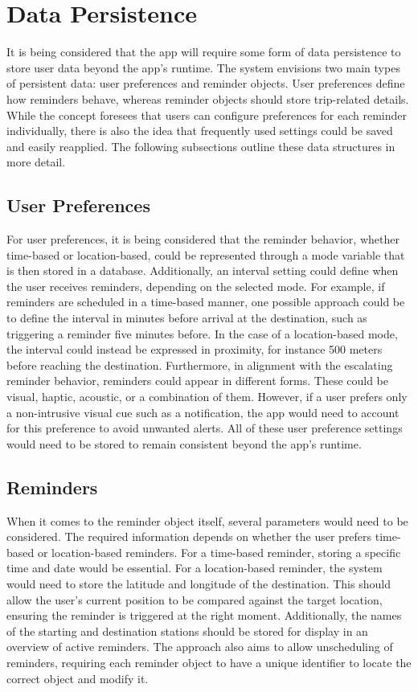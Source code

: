 \section{Data Persistence}
It is being considered that the app will require some form of data persistence to store user data beyond the app's runtime. 
The system envisions two main types of persistent data: user preferences and reminder objects. 
User preferences define how reminders behave, whereas reminder objects should store trip-related details.
While the concept foresees that users can configure preferences for each reminder individually, there is also the idea that frequently used settings could be saved and easily reapplied.
The following subsections outline these data structures in more detail.

\subsection{User Preferences}
For user preferences, it is being considered that the reminder behavior, whether time-based or location-based, could be represented through a mode variable that is then stored in a database.
Additionally, an interval setting could define when the user receives reminders, depending on the selected mode. 
For example, if reminders are scheduled in a time-based manner, one possible approach could be to define the interval in minutes before arrival at the destination, such as triggering a reminder five minutes before.
In the case of a location-based mode, the interval could instead be expressed in proximity, for instance 500 meters before reaching the destination.
Furthermore, in alignment with the escalating reminder behavior, reminders could appear in different forms. 
These could be visual, haptic, acoustic, or a combination of them. 
However, if a user prefers only a non-intrusive visual cue such as a notification, the app would need to account for this preference to avoid unwanted alerts.
All of these user preference settings would need to be stored to remain consistent beyond the app's runtime.

\subsection{Reminders}
When it comes to the reminder object itself, several parameters would need to be considered.
The required information depends on whether the user prefers time-based or location-based reminders.
For a time-based reminder, storing a specific time and date would be essential.
For a location-based reminder, the system would need to store the latitude and longitude of the destination.
This should allow the user's current position to be compared against the target location, ensuring the reminder is triggered at the right moment.
Additionally, the names of the starting and destination stations should be stored for display in an overview of active reminders.
The approach also aims to allow unscheduling of reminders, requiring each reminder object to have a unique identifier to locate the correct object and modify it.